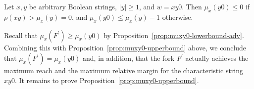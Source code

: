 

















\begin{proposition}\label{prop:muxy0-upperbound}
  Let $x, y$ be arbitrary Boolean strings, $|y| \geq 1$, and $w = xy0$. 
  Then $\mu_x(y0) \leq 0$ if $\rho(xy) > \mu_x(y) = 0$, and 
  $\mu_x(y0) \leq \mu_x(y) - 1$ otherwise.
\end{proposition}
Recall that $\mu_x(F^\prime) \geq \mu_x(y0)$ by Proposition~\ref{prop:muxy0-lowerbound-adv}. 
Combining this with Proposition~\ref{prop:muxy0-upperbound} above, we conclude 
that $\mu_x(F^\prime) = \mu_x(y0)$ and, in addition, that 
the fork $F^\prime$ actually achieves the maximum reach and 
the maximum relative margin 
for the characteristic string $xy0$. 
It remains to prove Proposition~\ref{prop:muxy0-upperbound}.

